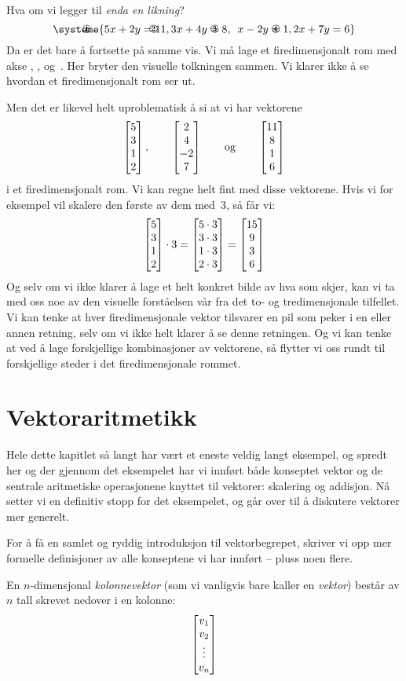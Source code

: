 \smallskip
Hva om vi legger til \emph{enda en likning}?
\[
\systeme{
\makebox[0pt][l]{\hspace{-2em}\En}   5x + 2y = 11,
\makebox[0pt][l]{\hspace{-2em}\To}   3x + 4y = 8,
\makebox[0pt][l]{\hspace{-2em}\Tre}  \phantom{3}x - 2y = 1,
\makebox[0pt][l]{\hspace{-2em}\Fire} 2x + 7y = 6
}
\]
Da er det bare å fortsette på samme vis.  Vi må lage et
firedimensjonalt rom med akse \En, \To, \Tre{} og~\Fire.  Her bryter
den visuelle tolkningen sammen.  Vi klarer ikke å se hvordan et
firedimensjonalt rom ser ut.

Men det er likevel helt uproblematisk å si at vi har vektorene
\[
\begin{bmatrix} 5 \\ 3 \\ 1 \\ 2 \end{bmatrix},\qquad
\begin{bmatrix} 2 \\ 4 \\ -2 \\ 7 \end{bmatrix}\qquad\text{og}\qquad
\begin{bmatrix} 11 \\ 8 \\ 1 \\ 6 \end{bmatrix}
\]
i et firedimensjonalt rom.  Vi kan regne helt fint med disse
vektorene.  Hvis vi for eksempel vil skalere den første av dem
med~$3$, så får vi:
\[
\begin{bmatrix} 5 \\ 3 \\ 1 \\ 2 \end{bmatrix} \cdot 3
= \begin{bmatrix} 5 \cdot 3 \\ 3 \cdot 3 \\ 1 \cdot 3 \\ 2 \cdot 3 \end{bmatrix}
= \begin{bmatrix} 15 \\ 9 \\ 3 \\ 6 \end{bmatrix}
\]
Og selv om vi ikke klarer å lage et helt konkret bilde av hva som
skjer, kan vi ta med oss noe av den visuelle forståelsen vår fra det
to- og tredimensjonale tilfellet.  Vi kan tenke at hver
firedimensjonale vektor tilsvarer en pil som peker i en eller annen
retning, selv om vi ikke helt klarer å se denne retningen.  Og vi kan
tenke at ved å lage forskjellige kombinasjoner av vektorene, så
flytter vi oss rundt til forskjellige steder i det firedimensjonale
rommet.


\section*{Vektoraritmetikk}

Hele dette kapitlet så langt har vært et eneste veldig langt eksempel,
og spredt her og der gjennom det eksempelet har vi innført både
konseptet vektor og de sentrale aritmetiske operasjonene knyttet til
vektorer: skalering og addisjon.  Nå setter vi en definitiv stopp for
det eksempelet, og går over til å diskutere vektorer mer generelt.

For å få en samlet og ryddig introduksjon til vektorbegrepet, skriver
vi opp mer formelle definisjoner av alle konseptene vi har innført --
pluss noen flere.

En $n$-dimensjonal \emph{kolonnevektor} (som vi vanligvis bare kaller
en \emph{vektor}) består av $n$ tall skrevet nedover i en kolonne:
\[
\begin{bmatrix} v_1 \\ v_2 \\ \vdots \\ v_n \end{bmatrix}
\]

